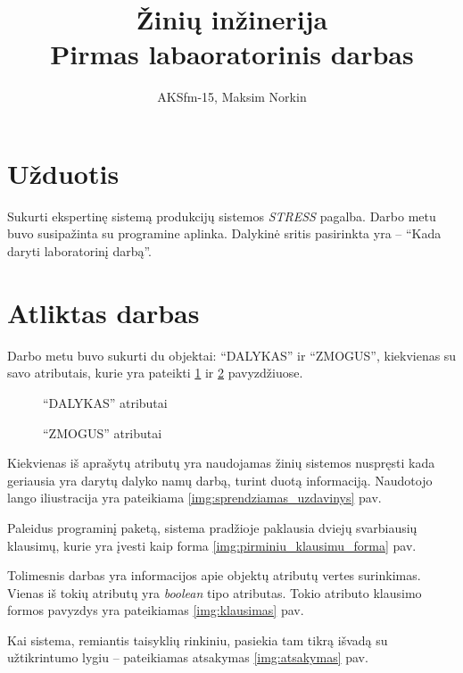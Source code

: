 \documentclass[11pt, a4paper, lithuanian]{article}
\author{AKSfm-15, Maksim Norkin}
\title{Žinių inžinerija\\Pirmas labaoratorinis darbas}
\begin{document}
    \maketitle

    \section{Užduotis}

    Sukurti ekspertinę sistemą produkcijų sistemos \textit{STRESS} pagalba. Darbo metu buvo susipažinta su programine aplinka. Dalykinė sritis pasirinkta yra -- ``Kada daryti laboratorinį darbą''.

    \section{Atliktas darbas}

    Darbo metu buvo sukurti du objektai: ``DALYKAS'' ir ``ZMOGUS'', kiekvienas su savo atributais, kurie yra pateikti \ref{code:dalykas_atributai} ir \ref{code:zmogus_atributai} pavyzdžiuose.

    \begin{figure}
      \centering
      
      \caption{``DALYKAS'' atributai}
      \label{code:dalykas_atributai}
    \end{figure}

    \begin{figure}
      \centering
      
      \caption{``ZMOGUS'' atributai}
      \label{code:zmogus_atributai}
    \end{figure}

    Kiekvienas iš aprašytų atributų yra naudojamas žinių sistemos nuspręsti kada geriausia yra darytų dalyko namų darbą, turint duotą informaciją. Naudotojo lango iliustracija yra pateikiama \ref{img:sprendziamas_uzdavinys} pav.

    Paleidus programinį paketą, sistema pradžioje paklausia dviejų svarbiausių klausimų, kurie yra įvesti kaip forma \ref{img:pirminiu_klausimu_forma} pav. 

    Tolimesnis darbas yra informacijos apie objektų atributų vertes surinkimas. Vienas iš tokių atributų yra \textit{boolean} tipo atributas. Tokio atributo klausimo formos pavyzdys yra pateikiamas \ref{img:klausimas} pav.

    Kai sistema, remiantis taisyklių rinkiniu, pasiekia tam tikrą išvadą su užtikrintumo lygiu -- pateikiamas atsakymas \ref{img:atsakymas} pav.
\end{document}
